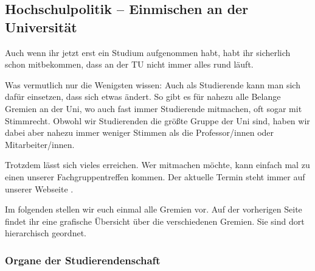 \subsection{Hochschulpolitik -- Einmischen an der Universität}

Auch wenn ihr jetzt erst ein Studium aufgenommen habt, habt ihr sicherlich 
schon mitbekommen, dass an der TU nicht immer alles rund läuft.

Was vermutlich nur die Wenigsten wissen: Auch als Studierende kann man sich 
dafür einsetzen, dass sich etwas ändert. So gibt es für nahezu alle Belange Gremien 
an der Uni, wo auch fast immer Studierende mitmachen, oft sogar mit Stimmrecht. 
Obwohl wir Studierenden die größte Gruppe der Uni sind, haben wir dabei aber nahezu immer 
weniger Stimmen als die Professor/innen oder Mitarbeiter/innen. 

Trotzdem lässt sich vieles erreichen. Wer mitmachen möchte, kann einfach 
mal zu einen unserer Fachgruppentreffen kommen. Der aktuelle Termin steht immer 
 auf unserer Webseite \fginfoUrl.

Im folgenden stellen wir euch einmal alle Gremien vor.
Auf der vorherigen Seite findet ihr eine grafische Übersicht über die verschiedenen Gremien. Sie sind dort hierarchisch geordnet.

\subsubsection*{Organe der Studierendenschaft}

